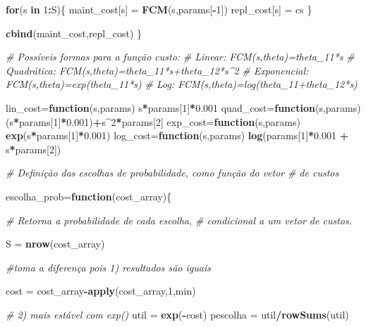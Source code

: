 \documentclass[12pt,a4paper]{article}
\newenvironment{Shaded}{\begin{snugshade}}{\end{snugshade}}
\newcommand{\CommentTok}[1]{\textcolor[rgb]{0.56,0.35,0.01}{\textit{#1}}}
\newcommand{\ControlFlowTok}[1]{\textcolor[rgb]{0.13,0.29,0.53}{\textbf{#1}}}
\newcommand{\DecValTok}[1]{\textcolor[rgb]{0.00,0.00,0.81}{#1}}
\newcommand{\FloatTok}[1]{\textcolor[rgb]{0.00,0.00,0.81}{#1}}
\newcommand{\KeywordTok}[1]{\textcolor[rgb]{0.13,0.29,0.53}{\textbf{#1}}}
\newcommand{\NormalTok}[1]{#1}
\newcommand{\OperatorTok}[1]{\textcolor[rgb]{0.81,0.36,0.00}{\textbf{#1}}}
\newcommand{\StringTok}[1]{\textcolor[rgb]{0.31,0.60,0.02}{#1}}
\begin{document}
\begin{Shaded}
\begin{Highlighting}[]
{  \ControlFlowTok{for}\NormalTok{(s }\ControlFlowTok{in} \DecValTok{1}\OperatorTok{:}\NormalTok{S)\{}
\NormalTok{    maint_cost[s] =}\StringTok{ }\KeywordTok{FCM}\NormalTok{(s,params[}\OperatorTok{-}\DecValTok{1}\NormalTok{])}
\NormalTok{    repl_cost[s] =}\StringTok{ }\NormalTok{cs}
\NormalTok{  \}}
  
  \KeywordTok{cbind}\NormalTok{(maint_cost,repl_cost)}
\NormalTok{\}}

\CommentTok{# Possíveis formas para a função custo:}
\CommentTok{# Linear: FCM(s,theta)=theta_11*s}
\CommentTok{# Quadrática: FCM(s,theta)=theta_11*s+theta_12*s^2}
\CommentTok{# Exponencial: FCM(s,theta)=exp(theta_11*s)}
\CommentTok{# Log: FCM(s,theta)=log(theta_11+theta_12*s)}

\NormalTok{lin_cost=}\ControlFlowTok{function}\NormalTok{(s,params) s}\OperatorTok{*}\NormalTok{params[}\DecValTok{1}\NormalTok{]}\OperatorTok{*}\FloatTok{0.001}
\NormalTok{quad_cost=}\ControlFlowTok{function}\NormalTok{(s,params) (s}\OperatorTok{*}\NormalTok{params[}\DecValTok{1}\NormalTok{]}\OperatorTok{*}\FloatTok{0.001}\NormalTok{)}\OperatorTok{+}\NormalTok{s}\OperatorTok{^}\DecValTok{2}\OperatorTok{*}\NormalTok{params[}\DecValTok{2}\NormalTok{]}
\NormalTok{exp_cost=}\ControlFlowTok{function}\NormalTok{(s,params) }\KeywordTok{exp}\NormalTok{(s}\OperatorTok{*}\NormalTok{params[}\DecValTok{1}\NormalTok{]}\OperatorTok{*}\FloatTok{0.001}\NormalTok{)}
\NormalTok{log_cost=}\ControlFlowTok{function}\NormalTok{(s,params) }\KeywordTok{log}\NormalTok{(params[}\DecValTok{1}\NormalTok{]}\OperatorTok{*}\FloatTok{0.001} \OperatorTok{+}\StringTok{ }\NormalTok{s}\OperatorTok{*}\NormalTok{params[}\DecValTok{2}\NormalTok{])}

\CommentTok{# Definição das escolhas de probabilidade, como função do vetor}
\CommentTok{# de custos}

\NormalTok{escolha_prob=}\ControlFlowTok{function}\NormalTok{(cost_array)\{}
  
  \CommentTok{# Retorna a probabilidade de cada escolha, }
  \CommentTok{# condicional a um vetor de custos.}
  
\NormalTok{  S =}\StringTok{ }\KeywordTok{nrow}\NormalTok{(cost_array)}
  
  \CommentTok{#toma a diferença pois 1) resultados são iguais}
  
\NormalTok{  cost =}\StringTok{ }\NormalTok{cost_array}\OperatorTok{-}\KeywordTok{apply}\NormalTok{(cost_array,}\DecValTok{1}\NormalTok{,min) }
  
  \CommentTok{# 2) mais estável com exp()}
\NormalTok{  util =}\StringTok{ }\KeywordTok{exp}\NormalTok{(}\OperatorTok{-}\NormalTok{cost)}
\NormalTok{  pescolha =}\StringTok{ }\NormalTok{util}\OperatorTok{/}\KeywordTok{rowSums}\NormalTok{(util)}
  
}
\end{Highlighting}
\end{Shaded}
\end{document}
